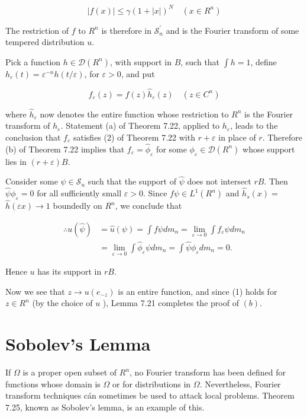 \documentclass[10pt]{article}
\begin{document}
$$
|f(x)| \leq \gamma(1+|x|)^{N} \quad\left(x \in R^{n}\right)
$$

The restriction of $f$ to $R^{n}$ is therefore in $\mathscr{S}_{n}^{\prime}$ and is the Fourier transform of some tempered distribution $u$.

Pick a function $h \in \mathscr{D}\left(R^{n}\right)$, with support in $B$, such that $\int h=1$, define $h_{\varepsilon}(t)=\varepsilon^{-n} h(t / \varepsilon)$, for $\varepsilon>0$, and put

$$
f_{\varepsilon}(z)=f(z) \hat{h}_{\varepsilon}(z) \quad\left(z \in C^{n}\right)
$$

where $\hat{h}_{\varepsilon}$ now denotes the entire function whose restriction to $R^{n}$ is the Fourier transform of $h_{\varepsilon}$. Statement (a) of Theorem 7.22, applied to $h_{\varepsilon}$, leads to the conclusion that $f_{\varepsilon}$ satisfies (2) of Theorem 7.22 with $r+\varepsilon$ in place of $r$. Therefore
(b) of Theorem 7.22 implies that $f_{\varepsilon}=\hat{\phi}_{\varepsilon}$ for some $\phi_{\varepsilon} \in \mathscr{D}\left(R^{n}\right)$ whose support
lies in $(r+\varepsilon) B$.

Consider some $\psi \in \mathscr{S}_{n}$ such that the support of $\hat{\psi}$ does not intersect $r B$. Then $\hat{\psi} \phi_{\varepsilon}=0$ for all sufficiently small $\varepsilon>0$. Since $f \psi \in L^{1}\left(R^{n}\right)$ and $\hat{h}_{s}(x)=$ $\hat{h}(\varepsilon x) \rightarrow 1$ boundedly on $R^{n}$, we conclude that

$$
\begin{aligned}
\therefore u(\hat{\psi}) & =\hat{u}(\psi)=\int f \psi d m_{n}=\lim _{\varepsilon \rightarrow 0} \int f_{\varepsilon} \psi d m_{n} \\
& =\lim _{\varepsilon \rightarrow 0} \int \hat{\phi}_{\varepsilon} \psi d m_{n}=\int \hat{\psi} \phi_{\varepsilon} d m_{n}=0 .
\end{aligned}
$$

Hence $u$ has its support in $r B$.

Now we see that $z \rightarrow u\left(e_{-z}\right)$ is an entire function, and since (1) holds for $z \in R^{n}$ (by the choice of $u$ ), Lemma 7.21 completes the proof of $(b)$.

\section{Sobolev's Lemma}
If $\Omega$ is a proper open subset of $R^{n}$, no Fourier transform has been defined for functions whose domain is $\Omega$ or for distributions in $\Omega$. Nevertheless, Fourier transform techniques cán sometimes be used to attack local problems. Theorem 7.25, known as Sobolev's lemma, is an example of this.
\end{document}
